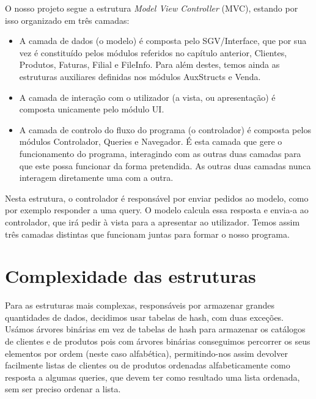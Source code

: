 \documentclass[a4paper]{report}
\begin{document}
	O nosso projeto segue a estrutura \textit{Model View Controller} (MVC), estando por isso organizado em três camadas:
	\begin{itemize}
		\item A camada de dados (o modelo) é composta pelo SGV/Interface, que por sua vez é constituído pelos módulos referidos no capítulo anterior, Clientes, Produtos, Faturas, Filial e FileInfo. Para além destes, temos ainda as estruturas auxiliares definidas nos módulos AuxStructs e Venda.
		\item A camada de interação com o utilizador (a vista, ou apresentação) é composta unicamente pelo módulo UI.
		\item A camada de controlo do fluxo do programa (o controlador) é composta pelos módulos Controlador, Queries e Navegador. É esta camada que gere o funcionamento do programa, interagindo com as outras duas camadas para que este possa funcionar da forma pretendida. As outras duas camadas nunca interagem diretamente uma com a outra.
	\end{itemize}
	Nesta estrutura, o controlador é responsável por enviar pedidos ao modelo, como por exemplo responder a uma query. O modelo calcula essa resposta e envia-a ao controlador, que irá pedir à vista para a apresentar ao utilizador. Temos assim três camadas distintas que funcionam juntas para formar o nosso programa.

	\chapter{Complexidade das estruturas}
	
	Para as estruturas mais complexas, responsáveis por armazenar grandes quantidades de dados, decidimos usar tabelas de hash, com duas exceções. Usámos árvores binárias em vez de tabelas de hash para armazenar os catálogos de clientes e de produtos pois com árvores binárias conseguimos percorrer os seus elementos por ordem (neste caso alfabética), permitindo-nos assim devolver facilmente listas de clientes ou de produtos ordenadas alfabeticamente como resposta a algumas queries, que devem ter como resultado uma lista ordenada, sem ser preciso ordenar a lista.
	
\end{document}
